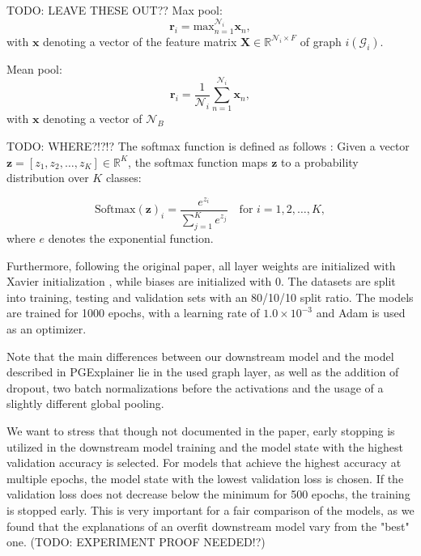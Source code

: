 TODO: LEAVE THESE OUT??
Max pool:
\begin{equation}
    \mathbf{r}_i = \text{max}_{n=1}^{\mathcal{N}_i} \mathbf{x}_n,
\end{equation}
with $\mathbf{x}$ denoting a vector of the feature matrix $\mathbf{X}\in \mathbb{R}^{\mathcal{N}_i\times F}$ of graph $i (\mathcal{G}_i)$.

Mean pool:
\begin{equation}
    \mathbf{r}_i = \frac{1}{\mathcal{N}_i}\sum_{n=1}^{\mathcal{N}_i} \mathbf{x}_n,
\end{equation}
with $\mathbf{x}$ denoting a vector of $\mathcal{N}_B$ 

TODO: WHERE?!?!?
The softmax function is defined as follows \cite{Goodfellow-et-al-2016}:
Given a vector \( \mathbf{z} = [z_1, z_2, \dots, z_K] \in \mathbb{R}^K \), the softmax function maps \( \mathbf{z} \) to a probability distribution over \( K \) classes:

\begin{equation}
    \text{Softmax}(\mathbf{z})_i = \frac{e^{z_i}}{\sum_{j=1}^{K} e^{z_j}} \quad \text{for } i = 1, 2, \dots, K,
\end{equation}
where $e$ denotes the exponential function.

Furthermore, following the original paper, all layer weights are initialized with Xavier initialization \cite{glorot2010understanding}, while biases are initialized with $0$. The datasets are split into training, testing and validation sets with an 80/10/10 split ratio. The models are trained for 1000 epochs, with a learning rate of $1.0 \times 10^{-3}$ and Adam \cite{kingma2014adam} is used as an optimizer.

Note that the main differences between our downstream model and the model described in PGExplainer \cite{luo2020parameterized} lie in the used graph layer, as well as the addition of dropout, two batch normalizations before the activations and the usage of a slightly different global pooling.

We want to stress that though not documented in the paper, early stopping is utilized in the downstream model training and the model state with the highest validation accuracy is selected. For models that achieve the highest accuracy at multiple epochs, the model state with the lowest validation loss is chosen. If the validation loss does not decrease below the minimum for 500 epochs, the training is stopped early. This is very important for a fair comparison of the models, as we found that the explanations of an overfit downstream model vary from the "best" one. (TODO: EXPERIMENT PROOF NEEDED!?) \bigskip

